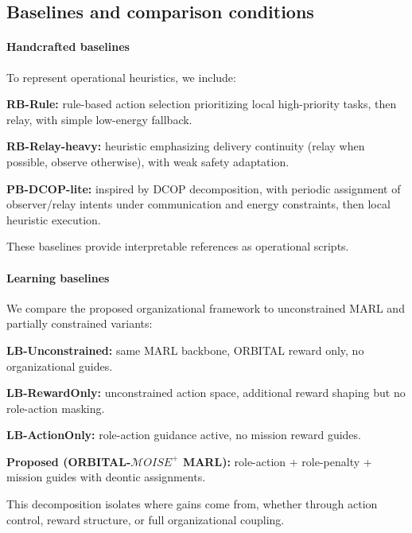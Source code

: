 \documentclass[sigconf]{aamas}
\begin{document}

\subsection{Baselines and comparison conditions}

\paragraph{Handcrafted baselines}
To represent operational heuristics, we include:
\begin{enumerate*}[label={\roman*) },itemjoin={; \quad}]
    \item \textbf{RB-Rule:} rule-based action selection prioritizing local high-priority tasks, then relay, with simple low-energy fallback.
    \item \textbf{RB-Relay-heavy:} heuristic emphasizing delivery continuity (relay when possible, observe otherwise), with weak safety adaptation.
    \item \textbf{PB-DCOP-lite:} inspired by DCOP decomposition, with periodic assignment of observer/relay intents under communication and energy constraints, then local heuristic execution.
\end{enumerate*}
These baselines provide interpretable references as operational scripts.

\paragraph{Learning baselines}
We compare the proposed organizational framework to unconstrained MARL and partially constrained variants:
\begin{enumerate*}[label={\roman*) },itemjoin={; \quad}]
    \item \textbf{LB-Unconstrained:} same MARL backbone, ORBITAL reward only, no organizational guides.
    \item \textbf{LB-RewardOnly:} unconstrained action space, additional reward shaping but no role-action masking.
    \item \textbf{LB-ActionOnly:} role-action guidance active, no mission reward guides.
    \item \textbf{Proposed (ORBITAL-$\mathcal{M}OISE^+$ MARL):} role-action + role-penalty + mission guides with deontic assignments.
\end{enumerate*}
This decomposition isolates where gains come from, whether through action control, reward structure, or full organizational coupling.
\end{document}

